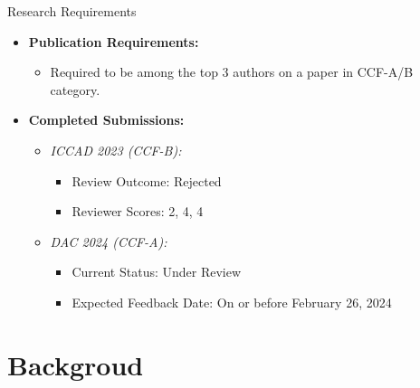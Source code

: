\documentclass[aspectratio=1610]{beamer}
\begin{document}
\begin{frame}{Research Requirements}
    \begin{itemize}
        \item \textbf{Publication Requirements:}
        \begin{itemize}
            \item Required to be among the top 3 authors on a paper in CCF-A/B category.
        \end{itemize}
        \item \textbf{Completed Submissions:}
        \begin{itemize}
            \item \textit{ICCAD 2023 (CCF-B):}
            \begin{itemize}
                \item Review Outcome: Rejected
                \item Reviewer Scores: 2, 4, 4
            \end{itemize}
            \item \textit{DAC 2024 (CCF-A):}
            \begin{itemize}
                \item Current Status: Under Review
                \item Expected Feedback Date: On or before February 26, 2024
            \end{itemize}
        \end{itemize}
    \end{itemize}
\end{frame}

\section{Backgroud}
\end{document}
